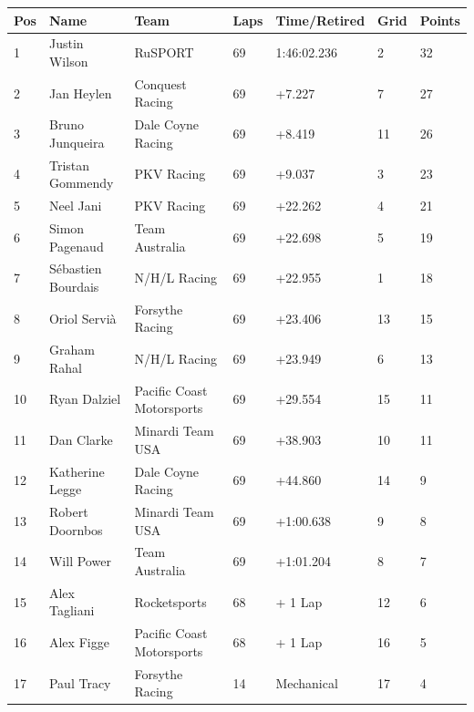 \documentclass{article}
\begin{document}
\begin{tabular}{lllllll}
\toprule
Pos & Name & Team & Laps & Time/Retired & Grid & Points \\
\midrule
1 & Justin Wilson & RuSPORT & 69 & 1:46:02.236 & 2 & 32 \\
2 & Jan Heylen & Conquest Racing & 69 & +7.227 & 7 & 27 \\
3 & Bruno Junqueira & Dale Coyne Racing & 69 & +8.419 & 11 & 26 \\
4 & Tristan Gommendy & PKV Racing & 69 & +9.037 & 3 & 23 \\
5 & Neel Jani & PKV Racing & 69 & +22.262 & 4 & 21 \\
6 & Simon Pagenaud & Team Australia & 69 & +22.698 & 5 & 19 \\
7 & Sébastien Bourdais & N/H/L Racing & 69 & +22.955 & 1 & 18 \\
8 & Oriol Servià & Forsythe Racing & 69 & +23.406 & 13 & 15 \\
9 & Graham Rahal & N/H/L Racing & 69 & +23.949 & 6 & 13 \\
10 & Ryan Dalziel & Pacific Coast Motorsports & 69 & +29.554 & 15 & 11 \\
11 & Dan Clarke & Minardi Team USA & 69 & +38.903 & 10 & 11 \\
12 & Katherine Legge & Dale Coyne Racing & 69 & +44.860 & 14 & 9 \\
13 & Robert Doornbos & Minardi Team USA & 69 & +1:00.638 & 9 & 8 \\
14 & Will Power & Team Australia & 69 & +1:01.204 & 8 & 7 \\
15 & Alex Tagliani & Rocketsports & 68 & + 1 Lap & 12 & 6 \\
16 & Alex Figge & Pacific Coast Motorsports & 68 & + 1 Lap & 16 & 5 \\
17 & Paul Tracy & Forsythe Racing & 14 & Mechanical & 17 & 4 \\
\bottomrule
\end{tabular}
\end{document}
